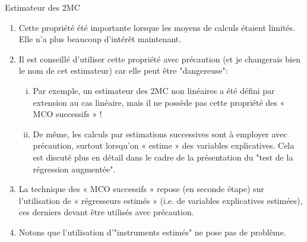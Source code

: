 \begin{frame}[allowframebreaks]{Estimateur des 2MC}
\begin{remark_fr*}
    \begin{enumerate}[$\star$]
        \item Cette propriété été importante lorsque les moyens de calculs étaient limités. 
        Elle n’a plus beaucoup d’intérêt maintenant.
        \item Il est conseillé d’utiliser cette propriété avec précaution 
        (et je changerais bien le nom de cet estimateur) car elle peut être "dangereuse":
        \begin{enumerate}[(i)]
        \item Par exemple, un estimateur des 2MC non linéaires a été défini par extension au cas linéaire, mais il ne possède pas cette propriété des « MCO successifs » !
        \item De même, les calculs par estimations successives sont à employer avec précaution, surtout lorsqu’on « estime » des variables explicatives. 
        Cela est discuté plus en détail dans le cadre
         de la présentation du "test de la régression augmentée".
    \end{enumerate}
    \item La technique des « MCO successifs » repose (en seconde étape) 
    sur l’utilisation de « régresseurs estimés » (i.e. de variables explicatives estimées), 
    ces derniers devant être utilisés avec précaution.
    \item Notons que l’utilisation d’"instruments estimés" ne pose pas de problème.
\end{enumerate}
\end{remark_fr*}
\end{frame}

